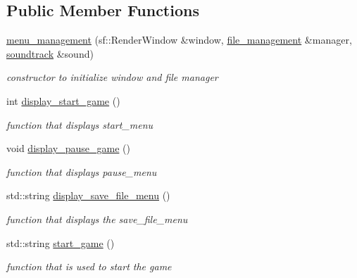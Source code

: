 \subsection*{Public Member Functions}
\begin{DoxyCompactItemize}
\item 
\hyperlink{classmenu__management_abc65b2b5ef39a07120aed543db8a22b5}{menu\+\_\+management} (sf\+::\+Render\+Window \&window, \hyperlink{classfile__management}{file\+\_\+management} \&manager, \hyperlink{classsoundtrack}{soundtrack} \&sound)
\begin{DoxyCompactList}\small\item\em constructor to initialize window and file manager \end{DoxyCompactList}\item 
int \hyperlink{classmenu__management_aad6e975e03cab2478f3ebec8da7eaf7d}{display\+\_\+start\+\_\+game} ()
\begin{DoxyCompactList}\small\item\em function that displays start\+\_\+menu \end{DoxyCompactList}\item 
void \hyperlink{classmenu__management_ab7aa6674e3428604073af06efe5aa791}{display\+\_\+pause\+\_\+game} ()
\begin{DoxyCompactList}\small\item\em function that displays pause\+\_\+menu \end{DoxyCompactList}\item 
std\+::string \hyperlink{classmenu__management_ac64c1eace3d955be8623a1129597dc54}{display\+\_\+save\+\_\+file\+\_\+menu} ()
\begin{DoxyCompactList}\small\item\em function that displays the save\+\_\+file\+\_\+menu \end{DoxyCompactList}\item 
std\+::string \hyperlink{classmenu__management_a92d22f059d33ccc5c3ae485804fd5fbb}{start\+\_\+game} ()
\begin{DoxyCompactList}\small\item\em function that is used to start the game \end{DoxyCompactList}\end{DoxyCompactItemize}
